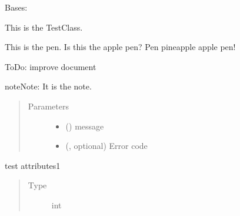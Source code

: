 \documentclass[letterpaper,10pt,dvipdfmx]{sphinxmanual}
\begin{document}
\begin{fulllineitems}
\label{\detokenize{test_lib:test_lib.TestClass.TestClass}}
Bases: 

This is the TestClass.

This is the pen.
Is this the apple pen?
Pen pineapple apple pen!

ToDo: improve document

\begin{sphinxadmonition}{note}{Note:}
It is the note.
\end{sphinxadmonition}
\begin{quote}\begin{description}
\item[{Parameters}] \leavevmode\begin{itemize}
\item {} 
 () \sphinxhyphen{}\sphinxhyphen{} message

\item {} 
 (, optional) \sphinxhyphen{}\sphinxhyphen{} Error code

\end{itemize}

\end{description}\end{quote}

\begin{fulllineitems}
\label{\detokenize{test_lib:test_lib.TestClass.TestClass.attr1}}
test attributes1
\begin{quote}\begin{description}
\item[{Type}] \leavevmode
int

\end{description}\end{quote}

\end{fulllineitems}



\end{fulllineitems}
\end{document}
